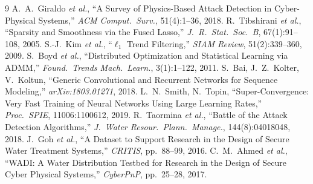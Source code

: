 \documentclass[10pt,a4paper]{article}
\begin{document}
\vspace{-0.5em}
{\footnotesize
\begin{thebibliography}{9}\setlength{\itemsep}{0pt}
 A.~A.~Giraldo \emph{et al.}, ``A Survey of Physics-Based Attack Detection in Cyber-Physical Systems,'' \emph{ACM Comput.\ Surv.}, 51(4):1--36, 2018.
 R.~Tibshirani \emph{et al.}, ``Sparsity and Smoothness via the Fused Lasso,'' \emph{J.\ R.\ Stat.\ Soc.\ B}, 67(1):91--108, 2005.
 S.-J.~Kim \emph{et al.}, ``$\ell_1$ Trend Filtering,'' \emph{SIAM Review}, 51(2):339--360, 2009.
 S.~Boyd \emph{et al.}, ``Distributed Optimization and Statistical Learning via ADMM,'' \emph{Found.\ Trends Mach.\ Learn.}, 3(1):1--122, 2011.
 S.~Bai, J.~Z.~Kolter, V.~Koltun, ``Generic Convolutional and Recurrent Networks for Sequence Modeling,'' \emph{arXiv:1803.01271}, 2018.
 L.~N.~Smith, N.~Topin, ``Super-Convergence: Very Fast Training of Neural Networks Using Large Learning Rates,'' \emph{Proc.\ SPIE}, 11006:1100612, 2019.
 R.~Taormina \emph{et al.}, ``Battle of the Attack Detection Algorithms,'' \emph{J.\ Water Resour.\ Plann.\ Manage.}, 144(8):04018048, 2018.
 J.~Goh \emph{et al.}, ``A Dataset to Support Research in the Design of Secure Water Treatment Systems,'' \emph{CRITIS}, pp.~88--99, 2016.
 C.~M.~Ahmed \emph{et al.}, ``WADI: A Water Distribution Testbed for Research in the Design of Secure Cyber Physical Systems,'' \emph{CyberPnP}, pp.~25--28, 2017.
\end{thebibliography}}
\end{document}
